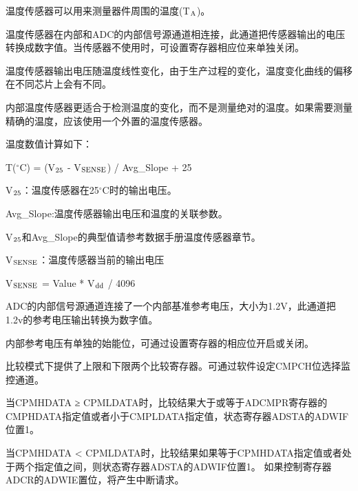 
温度传感器可以用来测量器件周围的温度(T$_{\rm A}$)。 \par 

温度传感器在内部和ADC的内部信号源通道相连接，此通道把传感器输出的电压转换成数字值。当传感器不使用时，可设置寄存器相应位来单独关闭。\par 

温度传感器输出电压随温度线性变化，由于生产过程的变化，温度变化曲线的偏移在不同芯片上会有不同。\par 

内部温度传感器更适合于检测温度的变化，而不是测量绝对的温度。如果需要测量精确的温度，应该使用一个外置的温度传感器。\par 

温度数值计算如下：\par 
T($^{\circ}$C) = (V$_{\rm 25}$ - V$_{\rm SENSE}$) / Avg\_Slope + 25\par
V$_{\rm 25}$：温度传感器在25$^{\circ}$C时的输出电压。\par 
Avg\_Slope:温度传感器输出电压和温度的关联参数。\par
V$_{\rm 25}$和Avg\_Slope的典型值请参考数据手册温度传感器章节。\par

V$_{\rm SENSE}$：温度传感器当前的输出电压\par 
V$_{\rm SENSE}$ = Value * V$_{\rm dd}$ / 4096\par

\par 

ADC的内部信号源通道连接了一个内部基准参考电压，大小为1.2V，此通道把1.2v的参考电压输出转换为数字值。

内部参考电压有单独的始能位，可通过设置寄存器的相应位开启或关闭。 


比较模式下提供了上限和下限两个比较寄存器。可通过软件设定CMPCH位选择监控通道。\par 

当CPMHDATA ≥ CPMLDATA时，比较结果大于或等于ADCMPR寄存器的CMPHDATA指定值或者小于CMPLDATA指定值，状态寄存器ADSTA的ADWIF位置1。\par

当CPMHDATA < CPMLDATA时，比较结果如果等于CPMHDATA指定值或者处于两个指定值之间，则状态寄存器ADSTA的ADWIF位置1。
如果控制寄存器ADCR的ADWIE置位，将产生中断请求。\par 


